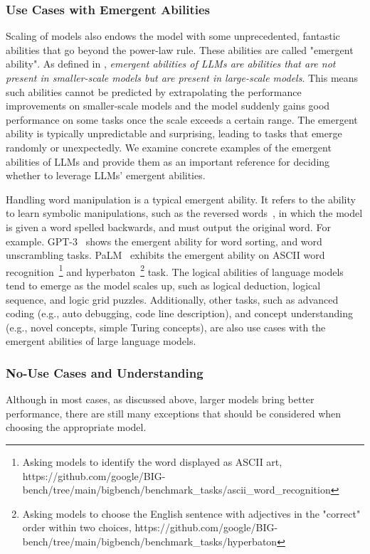 \documentclass[manuscript,screen, nonacm]{acmart}
\begin{document}
\subsubsection{Use Cases with Emergent Abilities}Scaling of models also endows the model with some unprecedented, fantastic abilities that go beyond the power-law rule. These abilities are called "emergent ability". As defined in \cite{wei2022emergent}, \textit{emergent abilities of LLMs are abilities that are not present in smaller-scale models but are present in large-scale models}. This means such abilities cannot be predicted by extrapolating the performance improvements on smaller-scale models and the model suddenly gains good performance on some tasks once the scale exceeds a certain range. The emergent ability is typically unpredictable and surprising, leading to tasks that emerge randomly or unexpectedly. We examine concrete examples of the emergent abilities of LLMs and provide them as an important reference for deciding whether to leverage LLMs' emergent abilities.

Handling word manipulation is a typical emergent ability. It refers to the ability to learn symbolic manipulations, such as the reversed words~\cite{brown2020language}, in which the model is given a word spelled backwards, and must output the original word. For example. GPT-3~\cite{brown2020language} shows the emergent ability for word sorting, and word unscrambling tasks. PaLM~\cite{chowdhery2022palm} exhibits the emergent ability on ASCII word recognition~\footnote{Asking models to identify the word displayed as ASCII art, https://github.com/google/BIG-bench/tree/main/bigbench/benchmark\_tasks/ascii\_word\_recognition} and hyperbaton~\footnote{Asking models to choose the English sentence with adjectives in the "correct" order within two choices, https://github.com/google/BIG-bench/tree/main/bigbench/benchmark\_tasks/hyperbaton} task. 
The logical abilities of language models tend to emerge as the model scales up, such as logical deduction, logical sequence, and logic grid puzzles. Additionally, other tasks, such as advanced coding (e.g., auto debugging, code line description), and concept understanding (e.g., novel concepts, simple Turing concepts), are also use cases with the emergent abilities of large language models.










\subsubsection{No-Use Cases and Understanding} Although in most cases, as discussed above, larger models bring better performance, there are still many exceptions that should be considered when choosing the appropriate model. 
\end{document}
